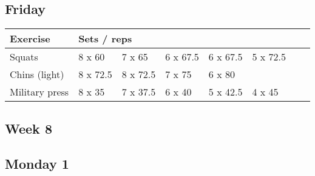 \documentclass[12pt, a4paper]{article}%
\begin{document}
  \subsection*{\hspace{0.5em} Friday }


  \begin{tabular}{l|lllllll}
  \hspace{0.75em} \textbf{Exercise} & \multicolumn{ 7 }{l}{ \textbf{Sets / reps} } \\ \hline

            \hspace{0.75em} Squats
            & 8 x 60
            & 7 x 65
            & 6 x 67.5
            & 6 x 67.5
            & 5 x 72.5
            & 
            & 
            \\


            \hspace{0.75em} Chins (light)
            & 8 x 72.5
            & 8 x 72.5
            & 7 x 75
            & 6 x 80
            & 
            & 
            & 
            \\


            \hspace{0.75em} Military press
            & 8 x 35
            & 7 x 37.5
            & 6 x 40
            & 5 x 42.5
            & 4 x 45
            & 
            & 
            \\


  \end{tabular}


\clearpage \subsection*{\hspace{0.25em} Week 8 }
  \subsection*{\hspace{0.5em} Monday 1 }
\end{document}
